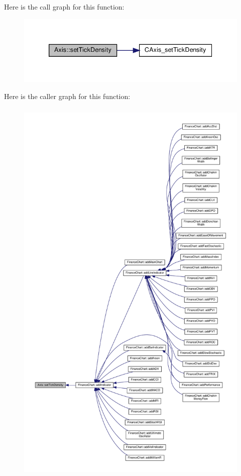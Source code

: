 Here is the call graph for this function\+:
\nopagebreak
\begin{figure}[H]
\begin{center}
\leavevmode
\includegraphics[width=339pt]{class_axis_abdb7eae83d8e09c6eb9583a9cabf00d2_cgraph}
\end{center}
\end{figure}
Here is the caller graph for this function\+:
\nopagebreak
\begin{figure}[H]
\begin{center}
\leavevmode
\includegraphics[height=550pt]{class_axis_abdb7eae83d8e09c6eb9583a9cabf00d2_icgraph}
\end{center}
\end{figure}
\mbox{\label{class_axis_aa74e4bc19a6a83b0f8dc6d3f815dd64e}} 
